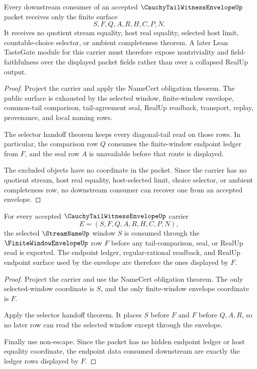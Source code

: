 \begin{theorem}
\label{thm:cauchy-tail-witness-envelope-nonescape}
Every downstream consumer of an accepted $\CauchyTailWitnessEnvelopeUp$ packet receives only the finite surface
$$
S,F,Q,A,R,H,C,P,N.
$$
It receives no quotient stream equality, host real equality, selected host limit, countable-choice selector, or ambient completeness theorem. A later Lean TasteGate module for this carrier must therefore expose nontriviality and field-faithfulness over the displayed packet fields rather than over a collapsed RealUp output.
\end{theorem}
\begin{proof}
Project the carrier and apply the NameCert obligation theorem. The public surface is exhausted by the selected window, finite-window envelope, common-tail comparison, tail-agreement seal, RealUp readback, transport, replay, provenance, and local naming rows.

The selector handoff theorem keeps every diagonal-tail read on those rows. In particular, the comparison row $Q$ consumes the finite-window endpoint ledger from $F$, and the seal row $A$ is unavailable before that route is displayed.

The excluded objects have no coordinate in the packet. Since the carrier has no quotient stream, host real equality, host-selected limit, choice selector, or ambient completeness row, no downstream consumer can recover one from an accepted envelope.
\end{proof}

\begin{theorem}
\label{thm:cauchy-tail-witness-envelope-finite-window-exactness}
For every accepted $\CauchyTailWitnessEnvelopeUp$ carrier
$$
E=(S,F,Q,A,R,H,C,P,N),
$$
the selected $\StreamNameUp$ window $S$ is consumed through the $\FiniteWindowEnvelopeUp$ row $F$ before any tail-comparison, seal, or RealUp read is exported. The endpoint ledger, regular-rational readback, and RealUp endpoint surface used by the envelope are therefore the ones displayed by $F$.
\end{theorem}
\begin{proof}
Project the carrier and use the NameCert obligation theorem. The only selected-window coordinate is $S$, and the only finite-window envelope coordinate is $F$.

Apply the selector handoff theorem. It places $S$ before $F$ and $F$ before $Q,A,R$, so no later row can read the selected window except through the envelope.

Finally use non-escape. Since the packet has no hidden endpoint ledger or host equality coordinate, the endpoint data consumed downstream are exactly the ledger rows displayed by $F$.
\end{proof}

